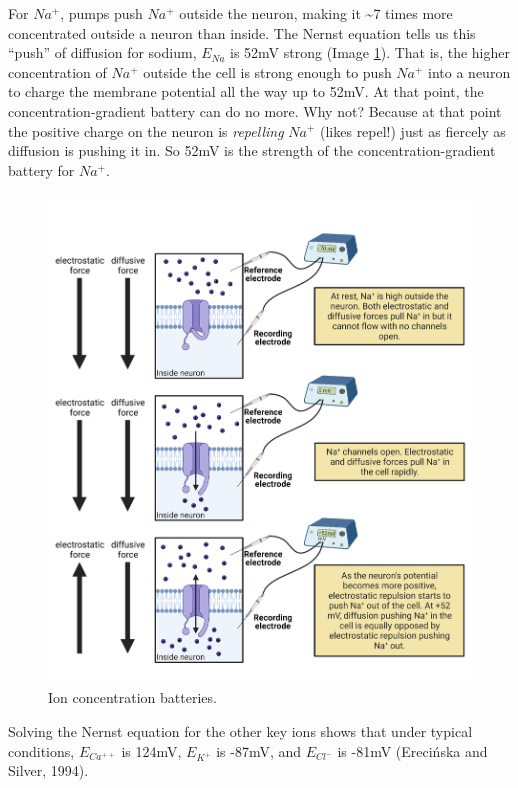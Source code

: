 \documentclass[
]{book}
\begin{document}
For \(Na^+\), pumps push \(Na^+\) outside the neuron, making it \textasciitilde7 times more concentrated outside a neuron than inside. The Nernst equation tells us this ``push'' of diffusion for sodium, \(E_{Na}\) is 52mV strong (Image \ref{fig:ion-concentration-batteries}). That is, the higher concentration of \(Na^+\) outside the cell is strong enough to push \(Na^+\) into a neuron to charge the membrane potential all the way up to 52mV. At that point, the concentration-gradient battery can do no more. Why not? Because at that point the positive charge on the neuron is \emph{repelling} \(Na^+\) (likes repel!) just as fiercely as diffusion is pushing it in. So 52mV is the strength of the concentration-gradient battery for \(Na^+\).

\begin{figure}

{\centering \includegraphics[width=0.9\linewidth]{images/ch02/02_17} 

}

\caption{Ion concentration batteries.}\label{fig:ion-concentration-batteries}
\end{figure}

Solving the Nernst equation for the other key ions shows that under typical conditions, \(E_{Ca^{++}}\) is 124mV, \(E_{K^+}\) is -87mV, and \(E_{Cl^-}\) is -81mV (Erecińska and Silver, 1994).
\end{document}
